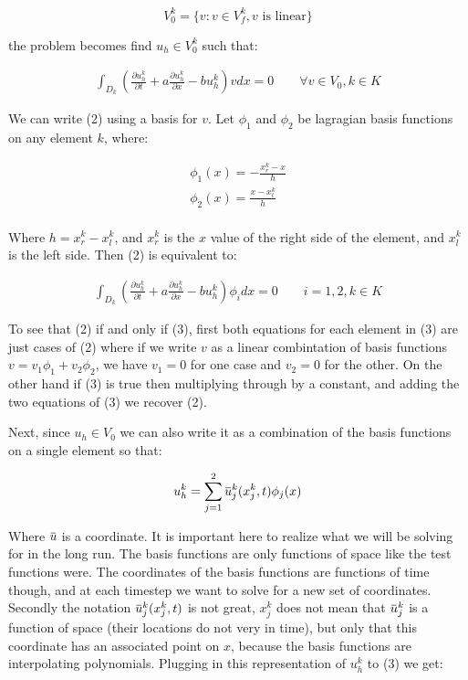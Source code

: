 \documentclass{article}
\newcommand{\overbar}[1]{\mkern 1.5mu\overline{\mkern-1.5mu#1\mkern-1.5mu}\mkern 1.5mu}
\begin{document}
$$ V_0^k = \{ v : v \in V_f^k, v \text{ is linear}\}$$

\noindent the problem becomes find $u_h \in V_0^k$ such that:

\begin{gather}
  \int_{D_k} \left(\frac{\partial u_h^k}{\partial t} + a \frac{\partial u_h^k}{\partial x} - bu_h^k\right) v dx = 0 \qquad \forall v \in V_0,  k \in K
\end{gather}

\noindent We can write (2) using a basis for $v$. Let $\phi_1$ and $\phi_2$ be lagragian basis functions on any element $k$, where:

\begin{gather*}
  \phi_1(x) = - \frac{x_r^k - x}{h}\\
  \phi_2(x) = \frac{x - x_l^k}{h}\\
\end{gather*}

Where $ h = x_r^k - x_l^k$, and $x_r^k$ is the $x$ value of the right side of the element, and $x_l^k$ is the left side.  Then (2) is equivalent to:

\begin{gather}
\int_{D_k} \left(\frac{\partial u_h^k}{\partial t} + a \frac{\partial u_h^k}{\partial x} - bu_h^k\right) \phi_i dx = 0 \qquad i = 1,2,  k \in K
\end{gather}

To see that (2) if and only if (3), first both equations for each element in (3) are just cases of (2) where if we write $v$ as a linear combintation of basis functions $v = v_1\phi_1 + v_2\phi_2$, we have $v_1 = 0$ for one case and $v_2 = 0$ for the other. On the other hand if (3) is true then multiplying through by a constant, and adding the two equations of (3) we recover (2).


Next, since $u_h \in V_0$ we can also write it as a combination of the basis functions on a single element so that:


$$u^k_h = \sum_{j=1}^2 \overbar{u}^k_j(x_j^k, t)\phi_j(x)$$

\noindent Where $\overbar{u}$ is a coordinate. It is important here to realize what we will be solving for in the long run. The basis functions are only functions of space like the test functions were. The coordinates of the basis functions are functions of time though, and at each timestep we want to solve for a new set of coordinates. Secondly the notation $ \overbar{u}^k_j(x_j^k, t)$ is not great, $x^k_j$ does not mean that $\overbar{u}^k_j$ is a function of space (their locations do not very in time), but only that this coordinate has an associated point on $x$, because the basis functions are interpolating polynomials. Plugging in this representation of $u_h^k$ to (3) we get:
\end{document}

